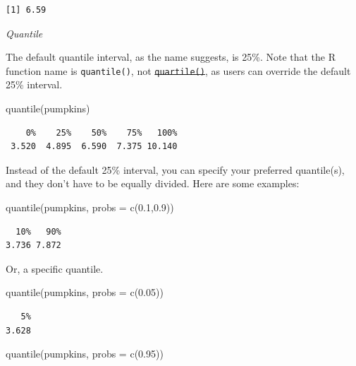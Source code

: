 \documentclass[
  letterpaper,
  DIV=11,
  numbers=noendperiod]{scrreprt}
\newenvironment{Shaded}{\begin{snugshade}}{\end{snugshade}}
\newcommand{\AttributeTok}[1]{\textcolor[rgb]{0.40,0.45,0.13}{#1}}
\newcommand{\FloatTok}[1]{\textcolor[rgb]{0.68,0.00,0.00}{#1}}
\newcommand{\FunctionTok}[1]{\textcolor[rgb]{0.28,0.35,0.67}{#1}}
\newcommand{\NormalTok}[1]{\textcolor[rgb]{0.00,0.23,0.31}{#1}}
\begin{document}
\begin{verbatim}
[1] 6.59
\end{verbatim}

\emph{Quantile}

The default quantile interval, as the name suggests, is 25\%. Note that
the R function name is \texttt{quantile()}, not
\st{\mbox{\texttt{quartile()}}}, as users can override the default 25\%
interval.

\begin{Shaded}
\begin{Highlighting}[]
\FunctionTok{quantile}\NormalTok{(pumpkins)}
\end{Highlighting}
\end{Shaded}

\begin{verbatim}
    0%    25%    50%    75%   100% 
 3.520  4.895  6.590  7.375 10.140 
\end{verbatim}

Instead of the default 25\% interval, you can specify your preferred
quantile(s), and they don't have to be equally divided. Here are some
examples:

\begin{Shaded}
\begin{Highlighting}[]
\FunctionTok{quantile}\NormalTok{(pumpkins, }\AttributeTok{probs =} \FunctionTok{c}\NormalTok{(}\FloatTok{0.1}\NormalTok{,}\FloatTok{0.9}\NormalTok{))}
\end{Highlighting}
\end{Shaded}

\begin{verbatim}
  10%   90% 
3.736 7.872 
\end{verbatim}

Or, a specific quantile.

\begin{Shaded}
\begin{Highlighting}[]
\FunctionTok{quantile}\NormalTok{(pumpkins, }\AttributeTok{probs =} \FunctionTok{c}\NormalTok{(}\FloatTok{0.05}\NormalTok{))}
\end{Highlighting}
\end{Shaded}

\begin{verbatim}
   5% 
3.628 
\end{verbatim}

\begin{Shaded}
\begin{Highlighting}[]
\FunctionTok{quantile}\NormalTok{(pumpkins, }\AttributeTok{probs =} \FunctionTok{c}\NormalTok{(}\FloatTok{0.95}\NormalTok{))}
\end{Highlighting}
\end{Shaded}
\end{document}

